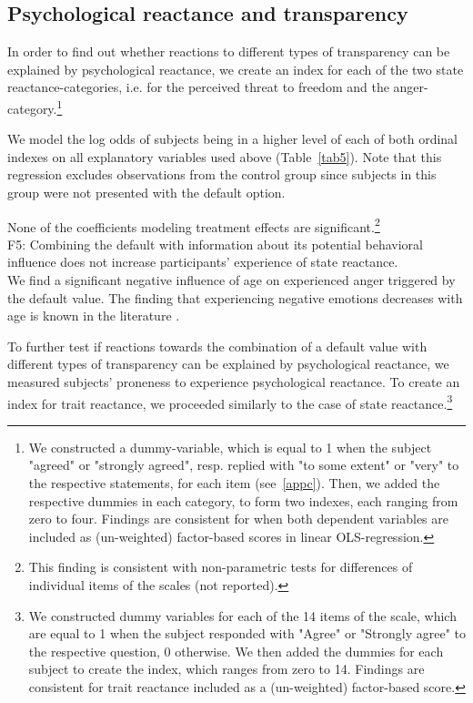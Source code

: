 \documentclass[review, authoryear,12pt]{elsarticle}
\begin{document}
\subsection{Psychological reactance and transparency}
In order to find out whether reactions to different types of transparency can be explained by psychological reactance, we create an index for each of the two state reactance-categories, i.e. for the perceived threat to freedom and the anger-category.\footnote{We constructed a dummy-variable, which is equal to 1 when the subject "agreed" or "strongly agreed", resp. replied with "to some extent" or "very" to the respective statements, for each item (see~\ref{appc}). Then, we added the respective dummies in each category, to form two indexes, each ranging from zero to four. Findings are consistent for when both dependent variables are included as (un-weighted) factor-based scores in linear OLS-regression.}

We model the log odds of subjects being in a higher level of each of both ordinal indexes on all explanatory variables used above (Table~\ref{tab5}). Note that this regression excludes observations from the control group since subjects in this group were not presented with the default option.

None of the coefficients modeling treatment effects are significant.\footnote{This finding is consistent with non-parametric tests for differences of individual items of the scales (not reported).} \\

F5: Combining the default with information about its potential behavioral influence does not increase participants' experience of state reactance. \\

We find a significant negative influence of age on experienced anger triggered by the default value. The finding that experiencing negative emotions decreases with age is known in the literature \citep[e.g.][]{Charles.2001}.

To further test if reactions towards the combination of a default value with different types of transparency can be explained by psychological reactance, we measured subjects' proneness to experience psychological reactance. To create an index for trait reactance, we proceeded similarly to the case of state reactance.\footnote{We constructed dummy variables for each of the 14 items of the scale, which are equal to 1 when the subject responded with "Agree" or "Strongly agree" to the respective question, 0 otherwise. We then added the dummies for each subject to create the index, which ranges from zero to 14. Findings are consistent for trait reactance included as a (un-weighted) factor-based score.}
\end{document}
